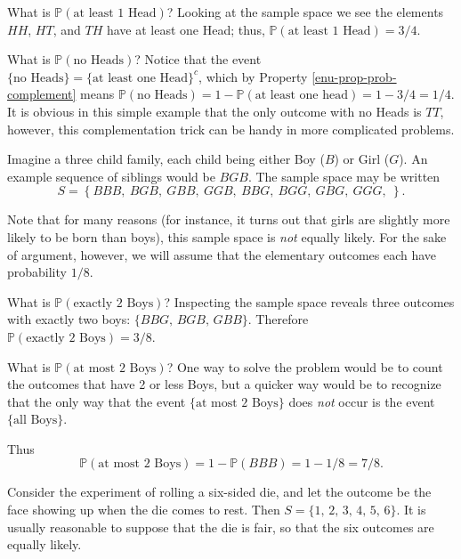\documentclass[]{book}
\numberwithin{equation}{chapter}
\numberwithin{figure}{chapter}
\theoremstyle{plain}
\theoremstyle{definition}
\theoremstyle{remark}
\theoremstyle{definition}
\theoremstyle{definition}
\theoremstyle{remark}
\let\BeginKnitrBlock\begin \let\EndKnitrBlock\end
\begin{document}
What is \(\mathbb{P}(\mbox{at least 1 Head})\)? Looking at the sample
space we see the elements \(HH\), \(HT\), and \(TH\) have at least one
Head; thus, \(\mathbb{P}(\mbox{at least 1 Head})=3/4\).

What is \(\mathbb{P}(\mbox{no Heads})\)? Notice that the event
\(\{ \mbox{no Heads} \} = \{ \mbox{at least one Head} \} ^{c}\), which
by Property \ref{enu-prop-prob-complement} means
\(\mathbb{P}(\mbox{no Heads})=1-\mathbb{P}(\mbox{at least one head})=1-3/4=1/4\).
It is obvious in this simple example that the only outcome with no Heads
is \(TT\), however, this complementation trick can be handy in more
complicated problems.

\bigskip

\BeginKnitrBlock{example}
\protect\hypertarget{ex:three-child-family}{}{\label{ex:three-child-family}}Imagine
a three child family, each child being either Boy (\(B\)) or Girl
(\(G\)). An example sequence of siblings would be \(BGB\). The sample
space may be written \[ S =
\left\{ BBB,\ BGB,\ GBB,\ GGB,\ BBG,\ BGG,\ GBG,\ GGG,\ \right\}.\]
\EndKnitrBlock{example}

Note that for many reasons (for instance, it turns out that girls are
slightly more likely to be born than boys), this sample space is
\emph{not} equally likely. For the sake of argument, however, we will
assume that the elementary outcomes each have probability \(1/8\).

What is \(\mathbb{P}(\mbox{exactly 2 Boys})\)? Inspecting the sample
space reveals three outcomes with exactly two boys:
\(\{ BBG,\, BGB,\, GBB \}\). Therefore
\(\mathbb{P}(\mbox{exactly 2 Boys}) = 3/8\).

What is \(\mathbb{P}(\mbox{at most 2 Boys})\)? One way to solve the
problem would be to count the outcomes that have 2 or less Boys, but a
quicker way would be to recognize that the only way that the event
\(\{ \mbox{at most 2 Boys} \}\) does \emph{not} occur is the event
\(\{ \mbox{all Boys} \}\).

Thus \[ \mathbb{P}(\mbox{at most 2 Boys}) = 1 - \mathbb{P}(BBB) = 1 -
1/8 = 7/8. \]

\bigskip

\BeginKnitrBlock{example}
\protect\hypertarget{ex:unnamed-chunk-125}{}{\label{ex:unnamed-chunk-125}}Consider
the experiment of rolling a six-sided die, and let the outcome be the
face showing up when the die comes to rest. Then
\(S = \{ 1,\,2,\,3,\,4,\,5,\,6 \}\). It is usually reasonable to suppose
that the die is fair, so that the six outcomes are equally likely.
\EndKnitrBlock{example}
\end{document}
